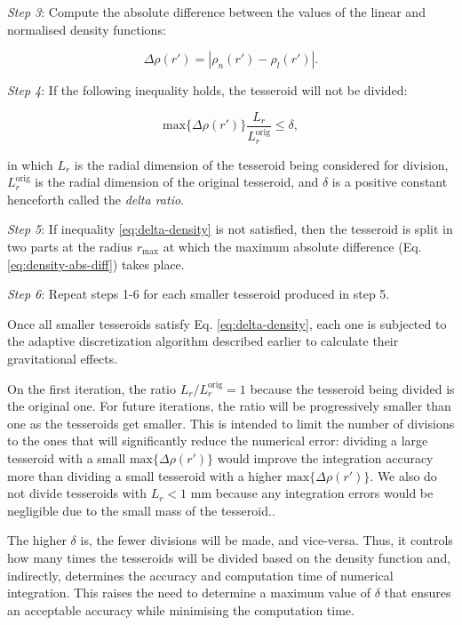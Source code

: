 \documentclass[extra, referee]{gji}
\begin{document}
\textit{Step 3}:
Compute the absolute difference between the values of the linear and normalised density
functions:

\begin{equation}
    \Delta \rho (r') = | \rho_n(r') - \rho_l(r') |.
    \label{eq:density-abs-diff}
\end{equation}

\textit{Step 4}:
If the following inequality holds, the tesseroid will not be divided:

\begin{equation}
    \text{max}\{ \Delta \rho(r') \} \frac{L_r}{L_r^\text{orig}} \le \delta,
    \label{eq:delta-density}
\end{equation}

\noindent
in which $L_r$ is the radial dimension of the tesseroid being considered for division,
$L_r^\text{orig}$ is the radial dimension of the original tesseroid, and
$\delta$ is a positive constant henceforth called the \textit{delta ratio}.

\textit{Step 5}:
If inequality \ref{eq:delta-density} is not satisfied, then the tesseroid is split in
two parts at the radius $r_\text{max}$ at which the maximum absolute difference (Eq.
\ref{eq:density-abs-diff}) takes place.

\textit{Step 6}:
Repeat steps 1-6 for each smaller tesseroid produced in step 5.

Once all smaller tesseroids satisfy Eq. \ref{eq:delta-density},
each one is subjected to the adaptive
discretization algorithm described earlier to calculate their gravitational effects.

On the first iteration, the ratio $L_r/L_r^\text{orig} = 1$ because the tesseroid being
divided is the original one.
For future iterations, the ratio will be progressively smaller than one as the
tesseroids get smaller.
This is intended to limit the number of divisions to the ones that will
significantly reduce the numerical error:
dividing a large tesseroid with a small $\text{max}\{ \Delta \rho(r') \}$ would
improve the integration accuracy more than dividing a small tesseroid with a
higher $\text{max}\{ \Delta \rho(r') \}$.
We also do not divide tesseroids with $L_r < 1$ mm because any integration errors would
be negligible due to the small mass of the tesseroid..

The higher $\delta$ is, the fewer divisions will be made, and vice-versa.
Thus, it controls how many times the tesseroids will be divided based on the density
function and, indirectly, determines the accuracy and computation time of
numerical integration.
This raises the need to determine a maximum value of $\delta$ that
ensures an acceptable accuracy while minimising the computation time.
\end{document}
